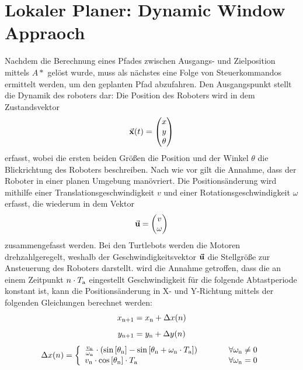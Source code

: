 \chapter{Lokaler Planer: Dynamic Window Appraoch}
Nachdem die Berechnung eines Pfades zwischen Ausgangs- und Zielposition mittels $A*$ gelöst wurde, muss als nächstes eine Folge von Steuerkommandos ermittelt werden, um den geplanten Pfad abzufahren. Den Ausgangspunkt stellt die Dynamik des roboters dar: Die Position des Roboters wird in dem Zustandsvektor 
\begin{equation}
\vec{\mathbf{x}}(t) = \begin{pmatrix}
x \\ y \\  \theta
\end{pmatrix}
\end{equation}
erfasst, wobei die ersten beiden Größen die Position und der Winkel $\theta$ die Blickrichtung des Roboters beschreiben. Nach wie vor gilt die Annahme, dass der Roboter in einer planen Umgebung manövriert. Die Positionsänderung wird mithilfe einer Translationsgeschwindigkeit $v$ und einer Rotationsgeschwindigkeit $\omega$ erfasst, die wiederum in dem Vektor
\begin{equation}
\vec{\mathbf{u}} = \begin{pmatrix}
v \\ \omega
\end{pmatrix}
\end{equation}
zusammengefasst werden. Bei den Turtlebots werden die Motoren drehzahlgeregelt, weshalb der Geschwindigkeitsvektor $\vec{\mathbf{u}}$ die Stellgröße zur Ansteuerung des Roboters darstellt. wird die Annahme getroffen, dass die an einem Zeitpunkt $n\cdot T_{\text{a}}$ eingestellt Geschwindigkeit für die folgende Abtastperiode konstant ist, kann die Positionsänderung in X- und Y-Richtung mittels der folgenden Gleichungen berechnet werden:
\begin{equation}
x_{\text{n+1}} = x_{\text{n}} + \Delta x(n)
\end{equation}
\begin{equation}
y_{\text{n+1}} = y_{\text{n}} + \Delta y(n)
\end{equation}
\begin{equation}
\Delta x(n) = \left\{ \begin{array}{ll}
\frac{v_{\text{n}}}{\omega_{\text{n}}}\cdot \left( \text{sin}\left[ {\theta_{\text{n}}} \right]-\text{sin}\left[ {\theta_{\text{n}}+\omega_{\text{n}}\cdot T_{\text{a}}} \right]\right) & \hspace{1cm} \forall \omega_{\text{n}} \neq 0 \\
v_{\text{n}}\cdot \text{cos}\left[ {\theta_{\text{n}}} \right]\cdot T_{\text{a}} & \hspace{1cm} \forall \omega_{\text{n}} = 0 \end{array}\right.
\end{equation}
